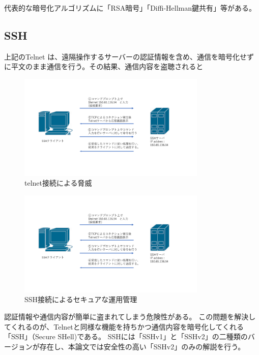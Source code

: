 \documentclass[12pt,a4paper,titlepage]{jsarticle}
\begin{document}
代表的な暗号化アルゴリズムに「RSA暗号」「Diffi-Hellman鍵共有」等がある。
\subsection{SSH}
上記のTelnet は、遠隔操作するサーバーの認証情報を含め、通信を暗号化せずに平文のまま通信を行う。その結果、通信内容を盗聴されると

\begin{figure}[h]
    \centering
    \includegraphics[width=0.8\textwidth, page=3]{graphs/network_archtecture.pdf}
    \caption{telnet接続による脅威}
    \label{telnet_flow}
\end{figure}
\begin{figure}[h]
    \centering
    \includegraphics[width=0.8\textwidth, page=4]{graphs/network_archtecture.pdf}
    \caption{SSH接続によるセキュアな運用管理}
    \label{SSH_security}
\end{figure}

認証情報や通信内容が簡単に盗まれてしまう危険性がある。
この問題を解決してくれるのが、Telnetと同様な機能を持ちかつ通信内容を暗号化してくれる「SSH」（Secure SHell)である。
SSHには「SSHv1」と「SSHv2」の二種類のバージョンが存在し、本論文では安全性の高い「SSHv2」のみの解説を行う。


\end{document}
